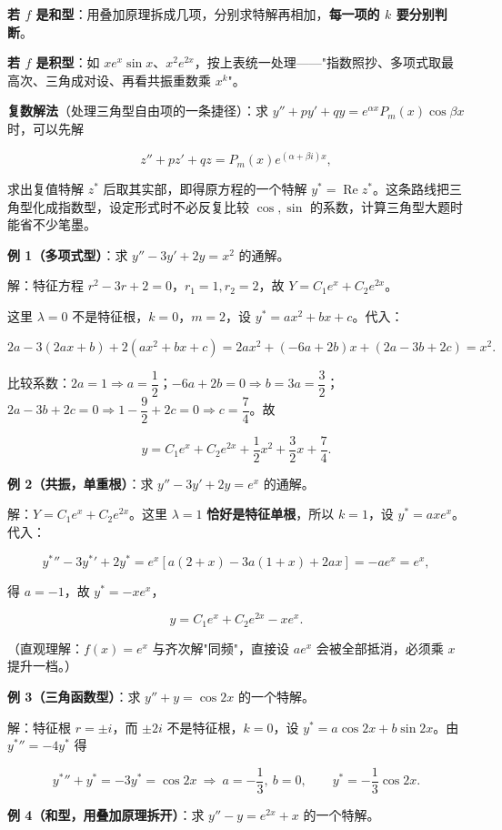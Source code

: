 \documentclass[11pt,openany,UTF8]{ctexbook}
\begin{document}
\textbf{若 $f$ 是和型}：用叠加原理拆成几项，分别求特解再相加，\textbf{每一项的 $k$ 要分别判断}。

\textbf{若 $f$ 是积型}：如 $x e^{x}\sin x$、$x^{2}e^{2x}$，按上表统一处理——"指数照抄、多项式取最高次、三角成对设、再看共振重数乘 $x^{k}$"。

\textbf{复数解法}（处理三角型自由项的一条捷径）：求 $y''+py'+qy=e^{\alpha x}P_m(x)\cos\beta x$ 时，可以先解

\[z''+pz'+qz=P_m(x)e^{(\alpha+\beta i)x},\]

求出复值特解 $z^{*}$ 后取其实部，即得原方程的一个特解 $y^{*}=\operatorname{Re}z^{*}$。这条路线把三角型化成指数型，设定形式时不必反复比较 $\cos,\sin$ 的系数，计算三角型大题时能省不少笔墨。

\textbf{例 1（多项式型）}：求 $y''-3y'+2y=x^{2}$ 的通解。

解：特征方程 $r^{2}-3r+2=0$，$r_1=1,r_2=2$，故 $Y=C_1e^{x}+C_2e^{2x}$。

这里 $\lambda=0$ 不是特征根，$k=0$，$m=2$，设 $y^{*}=ax^{2}+bx+c$。代入：

\[2a-3(2ax+b)+2(ax^{2}+bx+c)=2ax^{2}+(-6a+2b)x+(2a-3b+2c)=x^{2}.\]

比较系数：$2a=1\Rightarrow a=\dfrac12$；$-6a+2b=0\Rightarrow b=3a=\dfrac32$；$2a-3b+2c=0\Rightarrow 1-\dfrac92+2c=0\Rightarrow c=\dfrac74$。故

\[y=C_1e^{x}+C_2e^{2x}+\frac12x^{2}+\frac32x+\frac74 .\]

\textbf{例 2（共振，单重根）}：求 $y''-3y'+2y=e^{x}$ 的通解。

解：$Y=C_1e^{x}+C_2e^{2x}$。这里 $\lambda=1$ \textbf{恰好是特征单根}，所以 $k=1$，设 $y^{*}=axe^{x}$。代入：

\[{y^{*}}''-3{y^{*}}'+2y^{*}=e^{x}\left[a(2+x)-3a(1+x)+2ax\right]=-ae^{x}=e^{x},\]

得 $a=-1$，故 $y^{*}=-xe^{x}$，

\[y=C_1e^{x}+C_2e^{2x}-xe^{x}.\]

（直观理解：$f(x)=e^{x}$ 与齐次解"同频"，直接设 $ae^{x}$ 会被全部抵消，必须乘 $x$ 提升一档。）

\textbf{例 3（三角函数型）}：求 $y''+y=\cos 2x$ 的一个特解。

解：特征根 $r=\pm i$，而 $\pm 2i$ 不是特征根，$k=0$，设 $y^{*}=a\cos 2x+b\sin 2x$。由 ${y^{*}}''=-4y^{*}$ 得

\[{y^{*}}''+y^{*}=-3y^{*}=\cos 2x\ \Longrightarrow\ a=-\frac13,\ b=0,\qquad y^{*}=-\frac13\cos 2x .\]

\textbf{例 4（和型，用叠加原理拆开）}：求 $y''-y=e^{2x}+x$ 的一个特解。
\end{document}
